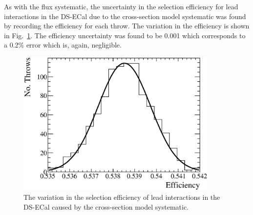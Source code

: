\newline
As with the flux systematic, the uncertainty in the selection efficiency for lead interactions in the DS-ECal due to the cross-section model systematic was found by recording the efficiency for each throw.  The variation in the efficiency is shown in Fig.~\ref{fig:XSecEfficiencyVariation}.  The efficiency uncertainty was found to be 0.001 which corresponds to a 0.2$\%$ error which is, again, negligible.
\begin{figure}[b!]
  \centering
  \includegraphics[width=10cm]{images/measurement/systematics/xsec/xsec_efficiency_variation.eps}
  \caption{The variation in the selection efficiency of lead interactions in the DS-ECal caused by the cross-section model systematic.}
  \label{fig:XSecEfficiencyVariation}
\end{figure}
\newline
\newline
